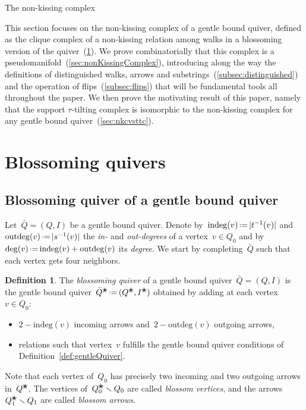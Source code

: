 \documentclass{amsart}
\makeatletter
\theoremstyle{definition}
\newtheorem{definition}[theorem]{Definition}
\newcommand{\ssm}{\smallsetminus} %
\newcommand{\eqdef}{\mbox{\,\raisebox{0.2ex}{\scriptsize\ensuremath{\mathrm:}}\ensuremath{=}\,}} %
\newcommand{\darkblue}{\color{darkblue}} %
\newcommand{\defn}[1]{\textsl{\darkblue #1}} %
\newcommand{\blossom}{^\text{\ding{96}}} %
\newcommand{\indeg}{\mathrm{indeg}} %
\newcommand{\outdeg}{\mathrm{outdeg}} %
\def\part{\@startsection{part}{1}%
\z@{.7\linespacing\@plus\linespacing}{.8\linespacing}%
{\LARGE\sffamily\centering}}
\makeatother
\begin{document}

\clearpage
\part{The non-kissing complex}
\label{part:combinatorics}

This section focuses on the non-kissing complex of a gentle bound quiver, defined as the clique complex of a non-kissing relation among walks in a blossoming version of the quiver~(\ref{sec:blossomingQuivers}).
We prove combinatorially that this complex is a pseudomanifold~(\ref{sec:nonKissingComplex}), introducing along the way the definitions of distinguished walks, arrows and substrings~(\ref{subsec:distinguished}) and the operation of flips~(\ref{subsec:flips}) that will be fundamental tools all throughout the paper.
We then prove the motivating result of this paper, namely that the support $\tau$-tilting complex is isomorphic to the non-kissing complex for any gentle bound quiver~(\ref{sec:nkcvsttc}).


\section{Blossoming quivers}
\label{sec:blossomingQuivers}

\subsection{Blossoming quiver of a gentle bound quiver}
\label{subsec:blossomingQuiver}

Let~${\bar Q = (Q,I)}$ be a gentle bound quiver.
Denote by~$\indeg(v) \eqdef |t^{-1}(v)|$ and~$\outdeg(v) \eqdef |s^{-1}(v)|$ the \defn{in-} and \defn{out-degrees} of a vertex~${v \in Q_0}$ and by~$\deg(v) \eqdef \indeg(v) + \outdeg(v)$ its \defn{degree}.
We start by completing~$\bar Q$ such that each vertex gets four neighbors.


\begin{definition}
The \defn{blossoming quiver} of a gentle bound quiver~${\bar Q = (Q,I)}$ is the gentle bound quiver~$\bar Q\blossom \eqdef (Q\blossom, I\blossom)$ obtained by adding at each vertex~$v \in Q_0$:
\begin{itemize}
\item $2-\indeg(v)$ incoming arrows and~$2-\outdeg(v)$ outgoing arrows,
\item relations such that vertex~$v$ fulfills the gentle bound quiver conditions of Definition~\ref{def:gentleQuiver}.
\end{itemize}
Note that each vertex of~$Q_0$ has precisely two incoming and two outgoing arrows in~$Q\blossom$.
The vertices of~$Q\blossom_0 \ssm Q_0$ are called \defn{blossom vertices}, and the arrows~$Q\blossom_1 \ssm Q_1$ are called \defn{blossom arrows}.
\end{definition}
\end{document}
